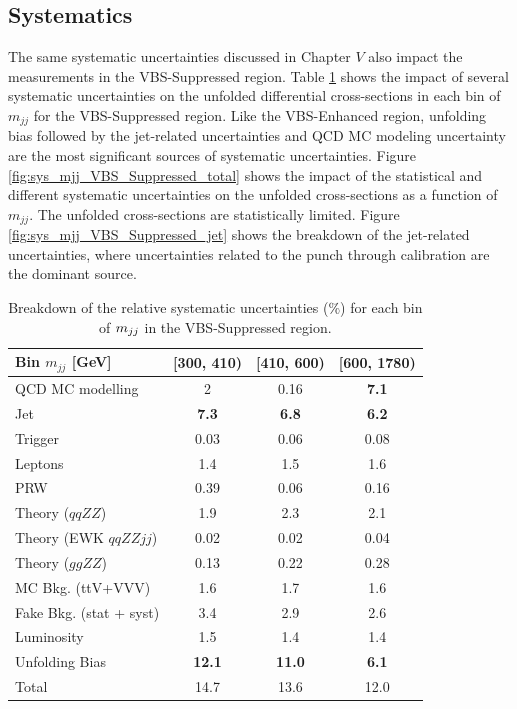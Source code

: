 \subsection{Systematics}
\label{appendix:VBSSupSys}
The same systematic uncertainties discussed in Chapter $V$ also impact the measurements in the VBS-Suppressed region. Table \ref{tab:systematics_mjj_VBS_Suppressed} shows the impact of several systematic uncertainties on the unfolded differential cross-sections in each bin of $m_{jj}$ for the VBS-Suppressed region. Like the VBS-Enhanced region, unfolding bias followed by the jet-related uncertainties and QCD MC modeling uncertainty are the most significant sources of systematic uncertainties. Figure \ref{fig:sys_mjj_VBS_Suppressed_total} shows the impact of the statistical and different systematic uncertainties on the unfolded cross-sections as a function of $m_{jj}$. The unfolded cross-sections are statistically limited. Figure \ref{fig:sys_mjj_VBS_Suppressed_jet} shows the breakdown of the jet-related uncertainties, where uncertainties related to the punch through calibration are the dominant source.  

\begin{table}
    \centering
    \caption{Breakdown of the relative systematic uncertainties ($\%$) for each bin of $m_{jj}$ in the VBS-Suppressed region. \label{tab:systematics_mjj_VBS_Suppressed}}
    \begin{tabular}{|l || c | c | c | }
    \hline 
    Bin $m_{jj}$ [GeV] & [300, 410) & [410, 600) & [600, 1780)\\
    \hline 
    QCD MC modelling & 2 & 0.16 & \textbf{7.1}\\
    Jet & \textbf{7.3} & \textbf{6.8} & \textbf{6.2 }\\
    Trigger & 0.03 & 0.06 & 0.08 \\
    Leptons & 1.4 & 1.5 & 1.6 \\
    PRW & 0.39 & 0.06 & 0.16\\
    Theory ($qqZZ$) & 1.9 & 2.3 & 2.1 \\
    Theory (EWK $qqZZjj$) & 0.02 & 0.02 & 0.04 \\
    Theory ($ggZZ$) & 0.13 & 0.22 & 0.28 \\
    MC Bkg. (ttV+VVV) & 1.6 & 1.7 & 1.6 \\
    Fake Bkg. (stat + syst) & 3.4 & 2.9 & 2.6 \\
    Luminosity & 1.5 & 1.4 & 1.4 \\
    Unfolding Bias & \textbf{12.1} & \textbf{11.0} & \textbf{6.1}\\
    \hline
    Total & 14.7 & 13.6 & 12.0 \\
    \hline
    \end{tabular}
\end{table}

